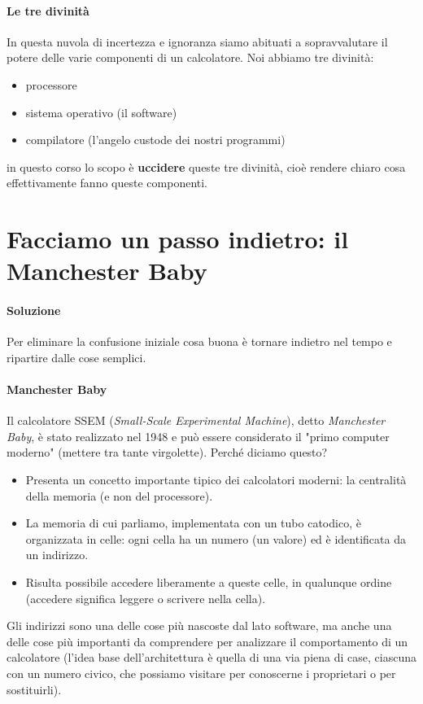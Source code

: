 \paragraph{Le tre divinità} In questa nuvola di incertezza e ignoranza siamo abituati a sopravvalutare il potere delle varie componenti di un calcolatore. Noi abbiamo tre divinità:
\begin{itemize}
	\item processore
	\item sistema operativo (il software)
	\item compilatore (l'angelo custode dei nostri programmi)
\end{itemize}
in questo corso lo scopo è \textbf{uccidere} queste tre divinità, cioè rendere chiaro cosa effettivamente fanno queste componenti.

\section{Facciamo un passo indietro: il Manchester Baby}
\paragraph{Soluzione} Per eliminare la confusione iniziale cosa buona è tornare indietro nel tempo e ripartire dalle cose semplici.
\paragraph{Manchester Baby} Il calcolatore SSEM (\emph{Small-Scale Experimental Machine}), detto \emph{Manchester Baby}, è stato realizzato nel 1948 e può essere considerato il  "primo computer moderno" (mettere tra tante virgolette). Perché diciamo questo?
\begin{itemize}
	\item Presenta un concetto importante tipico dei calcolatori moderni: la centralità della memoria (e non del processore).
	\item La memoria di cui parliamo, implementata con un tubo catodico, è organizzata in celle: ogni cella ha un numero (un valore) ed è identificata da un indirizzo.
	\item Risulta possibile accedere liberamente a queste celle, in qualunque ordine (accedere significa leggere o scrivere nella cella).
\end{itemize}
Gli indirizzi sono una delle cose più nascoste dal lato software, ma anche una delle cose più importanti da comprendere per analizzare il comportamento di un calcolatore (l'idea base dell'architettura è quella di una via piena di case, ciascuna con un numero civico, che possiamo visitare per conoscerne i proprietari o per sostituirli). 
